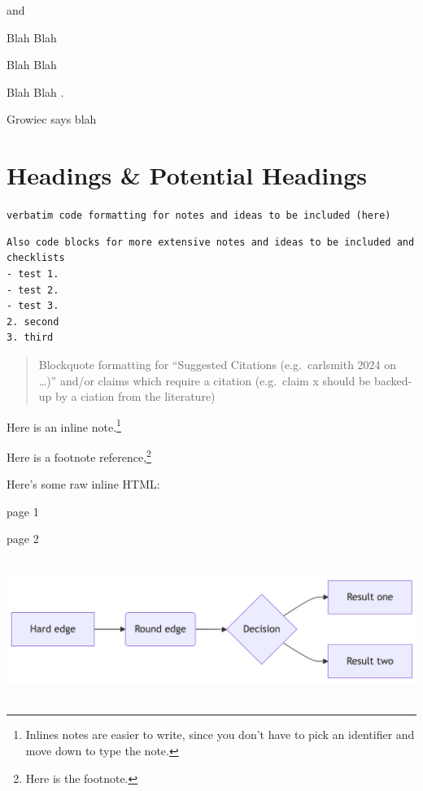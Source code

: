\documentclass[]{book}
\begin{document}

\textcite{soares2014}

\autocite{soares2014} and \autocite{knuth1984}

Blah Blah \autocites[see][33-35]{knuth1984}[also][chap.~1]{growiec2024}

Blah Blah \autocite[33-35, 38-39 and passim]{knuth1984}

Blah Blah \autocite{growiec2024,knuth1984}.

Growiec says blah \autocite*{growiec2024}

\section{Headings \& Potential Headings}\label{sec-heading}

\texttt{verbatim\ code\ formatting\ for\ notes\ and\ ideas\ to\ be\ included\ (here)}

\begin{verbatim}
Also code blocks for more extensive notes and ideas to be included and checklists
- test 1. 
- test 2. 
- test 3.
2. second
3. third
\end{verbatim}

\begin{quote}
Blockquote formatting for ``Suggested Citations (e.g.~carlsmith 2024 on
\ldots)'' and/or claims which require a citation (e.g.~claim x should be
backed-up by a ciation from the literature)
\end{quote}

Here is an inline note.\footnote{Inlines notes are easier to write,
  since you don't have to pick an identifier and move down to type the
  note.}

Here is a footnote reference,\footnote{Here is the footnote.}

\renewcommand*{\labelitemi}{\textgreater}

Here's some raw inline HTML:

page 1

\newpage{}

page 2

\includegraphics[width=6.88in,height=1.81in]{ref/references_files/figure-latex/mermaid-figure-1.png}
\end{document}
